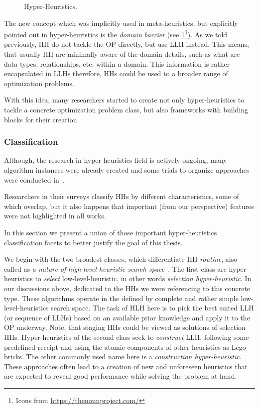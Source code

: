 \begin{figure}
	\centering
	
	\caption[Hyper-Heuristics]{Hyper-Heuristics.}
	\label{bg:pic:HH}
\end{figure}

The new concept which was implicitly used in meta-heuristics, but explicitly pointed out in hyper-heuristics is the \emph{domain barrier} (see \cref{bg:pic:HH}\footnote{Icons from \url{https://thenounproject.com/}}).
As we told previously, HH do not tackle the OP directly, but use LLH instead. This means, that usually HH are minimally aware of the domain details, such as what are data types, relationships, etc. within a domain. This information is rather encapsulated in LLHs therefore, HHs could be used to a broader range of optimization problems.

With this idea, many researchers started to create not only hyper-heuristics to tackle a concrete optimization problem class, but also frameworks with building blocks for their creation.


\subsubsection{Classification}
Although, the research in hyper-heuristics field is actively ongoing, many algorithm instances were already created and some trials to organize approaches were conducted in~\cite{ryser2014review,drake2019recent,burke2019classification}.

Researchers in their surveys classify HHs by different characteristics, some of which overlap, but it also happens that important (from our perspective) features were not highlighted in all works. 

In this section we present a union of those important hyper-heuristics classification facets to better justify the goal of this thesis.

We begin with the two broadest classes, which differentiate HH \emph{routine}, also called as \emph{a nature of high-level-heuristic search space}~\cite{burke2013hyper,burke2019classification,drake2019recent}.
The first class are hyper-heuristics to \textit{select} low-level-heuristic, in other words \textit{selection hyper-heuristic}. In our discussions above, dedicated to the HHs we were referencing to this concrete type. These algorithms operate in the defined by complete and rather simple low-level-heuristics search space. The task of HLH here is to pick the best suited LLH (or sequence of LLHs) based on an available prior knowledge and apply it to the OP underway. Note, that staging HHs could be viewed as solutions of selection HHs.
Hyper-heuristics of the second class seek to \textit{construct} LLH, following some predefined receipt and using the atomic components of other heuristics as Lego bricks. The other commonly used name here is a \textit{construction hyper-heuristic}. These approaches often lead to a creation of new and unforeseen heuristics that are expected to reveal good performance while solving the problem at hand.


